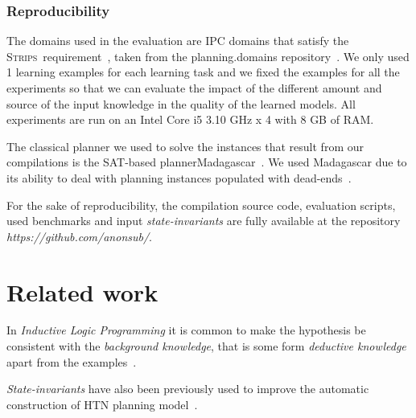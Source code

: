 \documentclass{article}
\newcommand{\strips}{\textsc{Strips}}
\begin{document}
\subsubsection{Reproducibility}
The domains used in the evaluation are IPC domains that satisfy the \strips\ requirement~\cite{fox2003pddl2}, taken from the {\sc planning.domains} repository~\cite{muise2016planning}. We only used 1 learning examples for each learning task and we fixed the examples for all the experiments so that we can evaluate the impact of the different amount and source of the input knowledge in the quality of the learned models. All experiments are run on an Intel Core i5 3.10 GHz x 4 with 8 GB of RAM.

The classical planner we used to solve the instances that result from our compilations is the SAT-based planner{\sc Madagascar}~\cite{rintanen2014madagascar}. We used {\sc Madagascar} due to its ability to deal with planning instances populated with dead-ends~\cite{lopez2015deterministic}. 

For the sake of reproducibility, the compilation source code, evaluation scripts, used benchmarks and input {\em state-invariants} are fully available at the repository {\em https://github.com/anonsub/}.


\section{Related work}
\label{sec:related}
In {\em Inductive Logic Programming} it is common to make the hypothesis be consistent with the {\em background knowledge}, that is some form {\em deductive knowledge} apart from the examples~\cite{muggleton1994inductive}.

{\em State-invariants} have also been previously used to improve the automatic construction of HTN planning model~\cite{lotinac2016constructing}.
\end{document}

